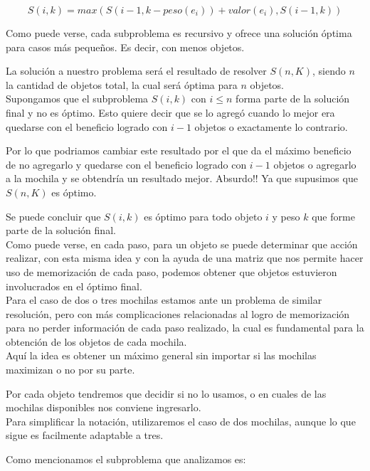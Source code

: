 \begin{equation}
S(i, k) = max(S(i-1, k-peso(e_i))+valor(e_i), S(i-1, k))
\end{equation}

Como puede verse, cada subproblema es recursivo y ofrece una solución \'optima para casos m\'as pequeños. Es decir, con menos objetos.

La solución a nuestro problema será el resultado de resolver $S(n, K)$, siendo $n$ la cantidad de objetos total, la cual será óptima para $n$ objetos.\\

Supongamos que el subproblema $S(i, k)$ con $i \leq n$ forma parte de la solución final y no es óptimo. Esto quiere decir que se lo agregó cuando lo mejor era quedarse con el beneficio logrado con $i-1$ objetos o exactamente lo contrario. 

Por lo que podriamos cambiar este resultado por el que da el máximo beneficio de no agregarlo y quedarse con el beneficio logrado con $i-1$ objetos o agregarlo a la mochila y se obtendría un resultado mejor. Absurdo!! Ya que supusimos que $S(n, K)$ es óptimo.

Se puede concluir que $S(i, k)$ es óptimo para todo objeto $i$ y peso $k$ que forme parte de la solución final.\\

Como puede verse, en cada paso, para un objeto se puede determinar que acción realizar, con esta misma idea y con la ayuda de una matriz que nos permite hacer uso de memorizaci\'on de cada paso, podemos obtener que objetos estuvieron involucrados en el \'optimo final.\\

Para el caso de dos o tres mochilas estamos ante un problema de similar resolución, pero con más complicaciones relacionadas al logro de memorización para no perder información de cada paso realizado, la cual es fundamental para la obtención de los objetos de cada mochila.\\

Aquí la idea es obtener un máximo general sin importar si las mochilas maximizan o no por su parte.

Por cada objeto tendremos que decidir si no lo usamos, o en cuales de las mochilas disponibles nos conviene ingresarlo.\\
Para simplificar la notación, utilizaremos el caso de dos mochilas, aunque lo que sigue es facilmente adaptable a tres.

Como mencionamos el subproblema que analizamos es:

